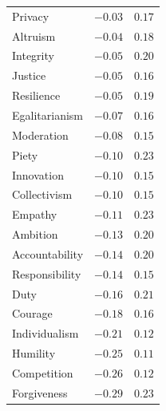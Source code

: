 \documentclass[11pt, letterpaper]{article}
\begin{document}
\begin{longtable}{lcc}
  Privacy & $-0.03$ & $0.17$ \\
  Altruism & $-0.04$ & $0.18$ \\
  Integrity & $-0.05$ & $0.20$ \\
  Justice & $-0.05$ & $0.16$ \\
  Resilience & $-0.05$ & $0.19$ \\
  Egalitarianism & $-0.07$ & $0.16$ \\
  Moderation & $-0.08$ & $0.15$ \\
  Piety & $-0.10$ & $0.23$ \\
  Innovation & $-0.10$ & $0.15$ \\
  Collectivism & $-0.10$ & $0.15$ \\
  Empathy & $-0.11$ & $0.23$ \\
  Ambition & $-0.13$ & $0.20$ \\
  Accountability & $-0.14$ & $0.20$ \\
  Responsibility & $-0.14$ & $0.15$ \\
  Duty & $-0.16$ & $0.21$ \\
  Courage & $-0.18$ & $0.16$ \\
  Individualism & $-0.21$ & $0.12$ \\
  Humility & $-0.25$ & $0.11$ \\
  Competition & $-0.26$ & $0.12$ \\
  Forgiveness & $-0.29$ & $0.23$ \\
\end{longtable}
\end{document}
